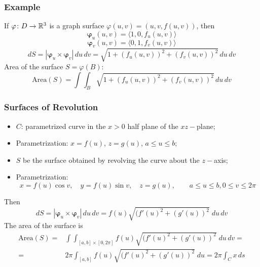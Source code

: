 \begin{frame}
  \frametitle{Example}

  If $\varphi \colon D \to {\mathbb{R}}^3$ is a graph surface $\varphi(u,v) = (u,v,f(u,v))$, then
%
\pause $$\bm{\varphi}_u(u,v) = \langle 1, 0 , f_u(u,v)\rangle$$
%
\pause $$\bm{\varphi}_v(u,v) = \langle 0,1,f_v(u,v) \rangle$$
%
\pause $$dS = |\bm{\varphi}_u \times \bm{\varphi}_v|\,du\,dv = \sqrt{1+(f_u(u,v))^2 + (f_v(u,v))^2} \, du\, dv$$
%
\pause Area of the surface $S = \varphi(B)$:
%
$$\text{Area}(S) = \int\!\!\!\int_B \sqrt{1+(f_u(u,v))^2 + (f_v(u,v))^2} \, du\, dv$$
%
\end{frame}

\begin{frame}
  \frametitle{Surfaces of Revolution}

\begin{itemize}
  \item $C$: parametrized curve in the $x>0$ half plane of the $xz-$plane;
  \item Parametrization: $x=f(u)$, $z=g(u)$, $a \leqslant u \leqslant b$;
  \item $S$ be the surface obtained by revolving the curve about the $z-$axis;
  \item \pause Parametrization:
  $$x=f(u)\cos{v}, \quad y=f(u)\sin{v}, \quad z=g(u), \qquad a \leqslant u \leqslant b, 0 \leqslant v \leqslant 2\pi$$
\end{itemize}
%
\pause Then
%
$$dS = |\bm{\varphi}_u \times \bm{\varphi}_v| \, du\, dv = f(u) \sqrt{(f'(u)^2+(g'(u))^2} \; du\, dv$$
%
The area of the surface is
%
\begin{align*}
  \text{Area}(S) = &  \int\!\!\!\int_{[a,b]\times [0,2\pi]} f(u) \sqrt{(f'(u)^2+(g'(u))^2} \; du\, dv = \\
   = & 2\pi \int_{[a,b]} f(u) \sqrt{(f'(u)^2+(g'(u))^2} \; du = 2\pi \int_C x \,ds
\end{align*}

\end{frame}

